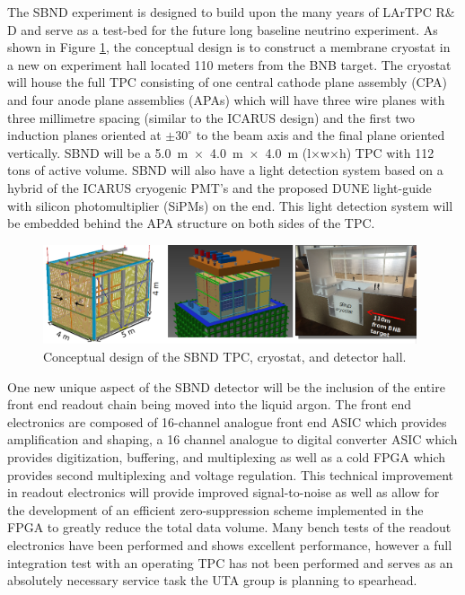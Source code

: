 
The SBND experiment is designed to build upon the many years of LArTPC R$\&$D and serve as a test-bed for the future long baseline neutrino experiment. As shown in Figure \ref{fig:sbnd}, the conceptual design is to construct a membrane cryostat in a new on experiment hall located 110 meters from the BNB target. The cryostat will house the full TPC consisting of one central cathode plane assembly (CPA) and four anode plane assemblies (APAs) which will have three wire planes with three millimetre spacing (similar to the ICARUS design) and the first two induction planes oriented at $\pm 30^{\circ}$ to the beam axis and the final plane oriented vertically. SBND will be a 5.0~m~$\times$~4.0~m~$\times$~4.0~m (l$\times$w$\times$h) TPC with 112 tons of active volume. SBND will also have a light detection system based on a hybrid of the ICARUS cryogenic PMT's and the proposed DUNE light-guide with silicon photomultiplier (SiPMs) on the end. This light detection system will be embedded behind the APA structure on both sides of the TPC. 

\begin{figure}[htb]
\centering
\includegraphics[width=0.98\textwidth]{images/sbnd.png}
\caption[]{Conceptual design of the SBND TPC, cryostat, and detector hall.}
\label{fig:sbnd}
\end{figure}

One new unique aspect of the SBND detector will be the inclusion of the entire front end readout chain being moved into the liquid argon. The front end electronics are composed of 16-channel analogue front end ASIC which provides amplification and shaping, a 16 channel analogue to digital converter ASIC which provides digitization, buffering, and multiplexing as well as a cold FPGA which provides second multiplexing and voltage regulation. This technical improvement in readout electronics will provide improved signal-to-noise as well as allow for the development of an efficient zero-suppression scheme implemented in the FPGA to greatly reduce the total data volume. Many bench tests of the readout electronics have been performed and shows excellent performance, however a full integration test with an operating TPC has not been performed and serves as an absolutely necessary service task the UTA group is planning to spearhead. 

